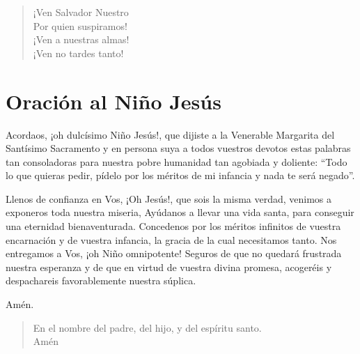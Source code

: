 \documentclass[spanish,utf8,12pt]{chlart}
\newenvironment{lectura}{\begingroup\color{lector}}{\endgroup\par}
\newenvironment{gozo}{\begin{verse}\color{lector}}{\end{verse}}
\newcommand*\vena{{\color{responden}\hspace{1em}¡Ven a nuestras almas!\\\hspace{1em}¡Ven no tardes tanto!}}
\begin{document}
\begin{gozo}
¡Ven Salvador Nuestro\\
Por quien suspiramos!\\
\vena
\end{gozo}

\section{Oración al Niño Jesús}
\begin{lectura}
Acordaos, ¡oh dulcísimo Niño Jesús!, que dijiste a la Venerable
Margarita del Santísimo Sacramento y en persona suya a todos vuestros
devotos estas palabras tan consoladoras para nuestra pobre humanidad tan
agobiada y doliente:
“Todo lo que quieras pedir, pídelo por los méritos de mi infancia y nada
te será negado”.

Llenos de confianza en Vos, ¡Oh Jesús!, que sois la misma verdad,
venimos a exponeros toda nuestra miseria, Ayúdanos a llevar una vida
santa, para conseguir una eternidad bienaventurada.
Concedenos por los méritos infinitos de vuestra encarnación y de vuestra
infancia, la gracia de la cual necesitamos tanto.
Nos entregamos a Vos, ¡oh Niño omnipotente!
Seguros de que no quedará frustrada nuestra esperanza y de que en virtud
de vuestra divina promesa, acogeréis y despachareis favorablemente
nuestra súplica.

Amén.
\end{lectura}

\begin{gozo}
En el nombre del padre, del hijo, y del espíritu santo.\\Amén
\end{gozo}
\end{document}
